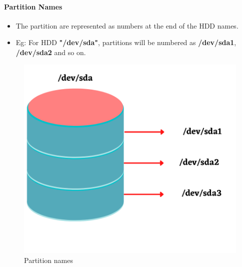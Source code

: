\begin{flushleft}
\paragraph{Partition Names}
\begin{itemize}
	\item The partition are represented as numbers at the end of the HDD names.
	\item Eg: For HDD \textbf{"/dev/sda"}, partitions will be numbered as \textbf{/dev/sda1}, \textbf{/dev/sda2} and so on.
\end{itemize}
	\begin{figure}[h!]
	\centering
	\includegraphics[scale=.38]{content/chapter8/images/partition_name.png}
	\caption{Partition names}
	\label{Partitions_naming}
\end{figure}		


\end{flushleft}
\newpage


